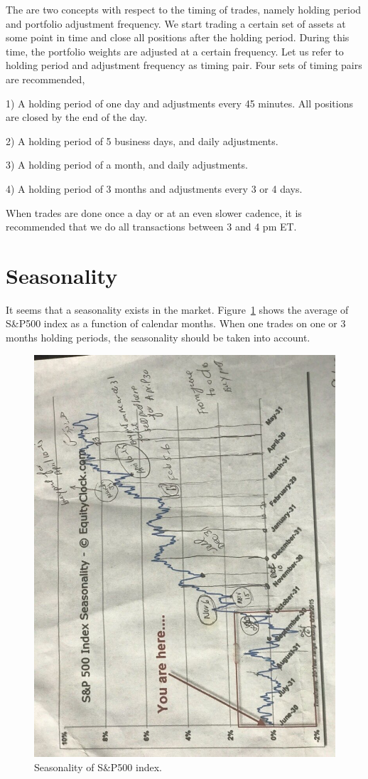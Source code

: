 \documentclass{article}
\begin{document}
The are two concepts with respect to the timing of trades, namely
holding period and portfolio adjustment frequency. We start trading a
certain set of assets at some point in time and close all positions
after the holding period. During this time, the portfolio weights are
adjusted at a certain frequency. Let us refer to holding period and
adjustment frequency as timing pair. Four sets of timing pairs are
recommended,

1) A holding period of one day and adjustments every 45 minutes. All
positions are closed by the end of the day.

2) A holding period of 5 business days, and daily adjustments.

3) A holding period of a month, and daily adjustments.

4) A holding period of 3 months and adjustments every 3 or 4 days.

When trades are done once a day or at an even slower cadence, it is
recommended that we do all transactions between 3 and 4 pm ET.

\section{Seasonality}\label{section:seasonality}

It seems that a seasonality exists in the
market. Figure~\ref{fig:seasonality} shows the average of S\&P500
index as a function of calendar months. When one trades on one or 3
months holding periods, the seasonality should be taken into account.

\begin{figure}\label{fig:seasonality}
\includegraphics[width = \textwidth, angle = -90 ]{figures/seasonality.JPG}
\caption{Seasonality of S\&P500 index.}
\end{figure}
\end{document}
